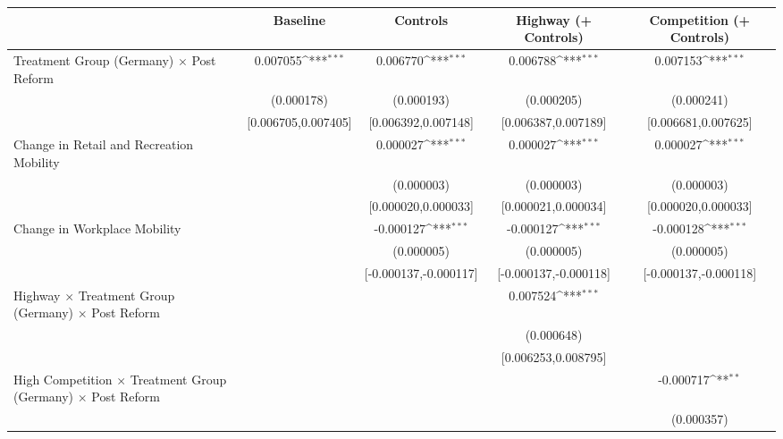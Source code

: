 {
\def\sym#1{\ifmmode^{#1}\else\(^{#1}\)\fi}
\begin{tabular}{l*{4}{c}}
\toprule
                    &\multicolumn{1}{c}{Baseline}&\multicolumn{1}{c}{Controls}&\multicolumn{1}{c}{Highway (+ Controls)}&\multicolumn{1}{c}{Competition (+ Controls)}\\
\midrule
Treatment Group (Germany) $\times$ Post Reform&    0.007055\sym{***}&    0.006770\sym{***}&    0.006788\sym{***}&    0.007153\sym{***}\\
                    &  (0.000178)         &  (0.000193)         &  (0.000205)         &  (0.000241)         \\
                    &[0.006705,0.007405]         &[0.006392,0.007148]         &[0.006387,0.007189]         &[0.006681,0.007625]         \\
Change in Retail and Recreation Mobility&                     &    0.000027\sym{***}&    0.000027\sym{***}&    0.000027\sym{***}\\
                    &                     &  (0.000003)         &  (0.000003)         &  (0.000003)         \\
                    &                     &[0.000020,0.000033]         &[0.000021,0.000034]         &[0.000020,0.000033]         \\
Change in Workplace Mobility&                     &   -0.000127\sym{***}&   -0.000127\sym{***}&   -0.000128\sym{***}\\
                    &                     &  (0.000005)         &  (0.000005)         &  (0.000005)         \\
                    &                     &[-0.000137,-0.000117]         &[-0.000137,-0.000118]         &[-0.000137,-0.000118]         \\
Highway $\times$ Treatment Group (Germany) $\times$ Post Reform&                     &                     &    0.007524\sym{***}&                     \\
                    &                     &                     &  (0.000648)         &                     \\
                    &                     &                     &[0.006253,0.008795]         &                     \\
High Competition $\times$ Treatment Group (Germany) $\times$ Post Reform&                     &                     &                     &   -0.000717\sym{**} \\
                    &                     &                     &                     &  (0.000357)         \\

\end{tabular}}

